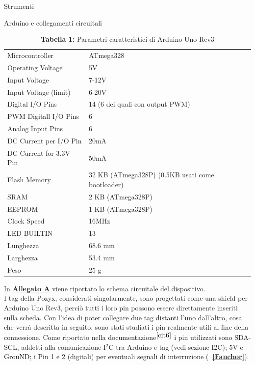 \documentclass[12pt]{report}
\begin{document}
\begin{section}{Strumenti}
\begin{subsection}{Arduino e collegamenti circuitali}
		\begin{table}[h]
			\centering
			\begin{tabular}{|ll|}
				\hline
				Microcontroller& 						ATmega328\\
				Operating Voltage&					5V\\
				Input Voltage&							7-12V\\
				Input Voltage (limit)&				6-20V\\
				Digital I/O Pins&						14 (6 dei quali con output PWM)\\
				PWM Digitall I/O Pins&				6\\		
				Analog Input Pins&					6\\
				DC Current per I/O Pin&				20mA\\
				DC Current for 3.3V Pin&			50mA\\
				Flash Memory&							32 KB (ATmega328P) (0.5KB usati come bootloader)\\	
				SRAM&										2 KB (ATmega328P)\\
				EEPROM&									1 KB (ATmega328P)\\
				Clock Speed&							16MHz\\
				LED BUILTIN&							13\\
				Lunghezza&								68.6 mm\\
				Larghezza&								53.4 mm\\
				Peso&										25 g\\
				\hline
		   \end{tabular}
		   \caption{\textbf{Tabella 1: }Parametri caratteristici di Arduino Uno Rev3\label{TArduinoUno}}
	 	\end{table}

		In  \hyperlink{A1}{\textbf{Allegato A}} viene riportato lo schema circuitale del dispositivo.\\

		\hypertarget{S1}{I} tag della Pozyx, considerati singolarmente, sono progettati come una shield per Arduino Uno Rev3, perciò tutti i loro pin possono essere direttamente inseriti sulla scheda. Con l’idea di poter collegare due tag distanti l’uno dall’altro, cosa che verrà descritta in seguito, sono stati studiati i pin 						realmente utili al fine della connessione. Come riportato nella documentazione$^{{\cite{cit6}}}$ i pin utilizzati sono SDA-SCL, addetti alla comunicazione I$^2$C tra Arduino e tag (vedi sezione I2C); 5V e GrouND; i Pin 1 e 2 (digitali) per eventuali segnali di interruzione (\textbf{\figurename~\ref{Fanchor}}).


\end{subsection}
\end{section}
\end{document}
